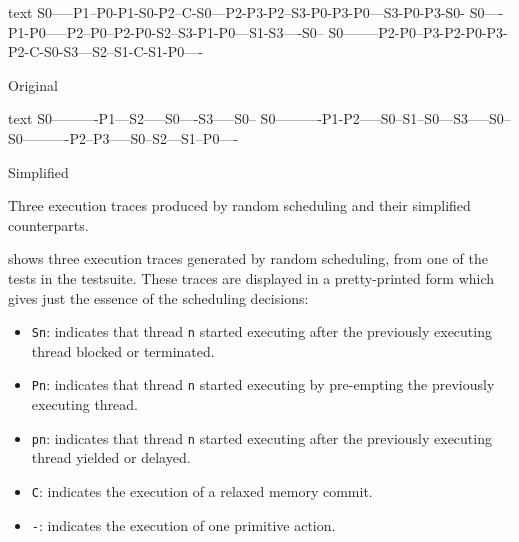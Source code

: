 \begin{listing}
\begin{sublisting}{\textwidth}
\centering
\begin{cminted}{text}
S0-----P1--P0-P1-S0-P2--C-S0---P2-P3-P2--S3-P0-P3-P0---S3-P0-P3-S0-
S0----P1-P0-----P2--P0--P2-P0-S2--S3-P1-P0---S1-S3----S0--
S0--------P2-P0--P3-P2-P0-P3-P2-C-S0-S3---S2--S1-C-S1-P0----
\end{cminted}
\caption{Original}\label{lst:trace_simplification_orig}
\end{sublisting}

\vspace{1.5em}

\begin{sublisting}{\textwidth}
\centering
\begin{cminted}{text}
S0----------P1---S2-----S0----S3-----S0--
S0----------P1-P2-----S0--S1--S0---S3-----S0--
S0----------P2--P3-----S0--S2---S1--P0----
\end{cminted}
\caption{Simplified}\label{lst:trace_simplification_simplified}
\end{sublisting}
\caption[The effect of trace simplification.]{Three execution traces produced by random scheduling and their simplified counterparts.}\label{lst:trace_simplification}
\end{listing}

 shows three execution traces generated
by random scheduling, from one of the tests in the \dejafu{}
testsuite.  These traces are displayed in a pretty-printed form which
gives just the essence of the scheduling decisions:

\begin{itemize}
\item \verb|Sn|: indicates that thread \verb|n| started executing
  after the previously executing thread blocked or terminated.
\item \verb|Pn|: indicates that thread \verb|n| started executing by
  pre-empting the previously executing thread.
\item \verb|pn|: indicates that thread \verb|n| started executing
  after the previously executing thread yielded or delayed.
\item \verb|C|: indicates the execution of a relaxed memory commit.
\item \verb|-|: indicates the execution of one primitive action.
\end{itemize}

